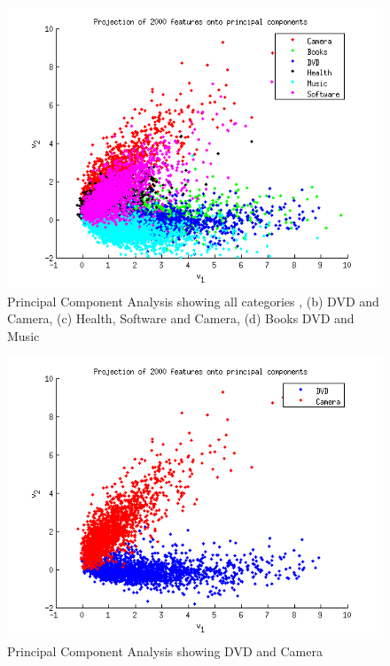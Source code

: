 \begin{figure}[H]
\centering
\includegraphics[scale = 1]{../Plottar/pca_all.png}
\caption{Principal Component Analysis showing all categories , (b) DVD and Camera, (c) Health, Software and Camera, (d) Books DVD and Music
}
\end{figure} 

\begin{figure}[H]
\centering
\includegraphics[scale = 1]{../Plottar/pca_nocorr.png}
\caption{Principal Component Analysis showing DVD and Camera}
\end{figure} 

